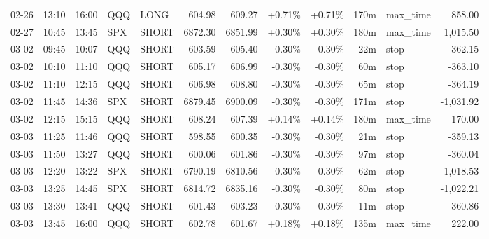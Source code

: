 \documentclass[11pt,a4paper,twoside]{article}
\begin{document}
\begin{center}
\begin{longtable}{>{\color{txtmain}}l l l l l r r r r r >{\color{txtmain}}l r}
02-26 & 13:10 & 16:00 & QQQ & LONG & 604.98 & 609.27 & \textcolor{wingreen}{+0.71\%} & \textcolor{wingreen}{+0.71\%} & 170m & max\_time & \textcolor{wingreen}{858.00} \\
02-27 & 10:45 & 13:45 & SPX & SHORT & 6872.30 & 6851.99 & \textcolor{wingreen}{+0.30\%} & \textcolor{wingreen}{+0.30\%} & 180m & max\_time & \textcolor{wingreen}{1,015.50} \\
03-02 & 09:45 & 10:07 & QQQ & SHORT & 603.59 & 605.40 & \textcolor{lossred}{-0.30\%} & \textcolor{lossred}{-0.30\%} & 22m & stop & \textcolor{lossred}{-362.15} \\
03-02 & 10:10 & 11:10 & QQQ & SHORT & 605.17 & 606.99 & \textcolor{lossred}{-0.30\%} & \textcolor{lossred}{-0.30\%} & 60m & stop & \textcolor{lossred}{-363.10} \\
03-02 & 11:10 & 12:15 & QQQ & SHORT & 606.98 & 608.80 & \textcolor{lossred}{-0.30\%} & \textcolor{lossred}{-0.30\%} & 65m & stop & \textcolor{lossred}{-364.19} \\
03-02 & 11:45 & 14:36 & SPX & SHORT & 6879.45 & 6900.09 & \textcolor{lossred}{-0.30\%} & \textcolor{lossred}{-0.30\%} & 171m & stop & \textcolor{lossred}{-1,031.92} \\
03-02 & 12:15 & 15:15 & QQQ & SHORT & 608.24 & 607.39 & \textcolor{wingreen}{+0.14\%} & \textcolor{wingreen}{+0.14\%} & 180m & max\_time & \textcolor{wingreen}{170.00} \\
03-03 & 11:25 & 11:46 & QQQ & SHORT & 598.55 & 600.35 & \textcolor{lossred}{-0.30\%} & \textcolor{lossred}{-0.30\%} & 21m & stop & \textcolor{lossred}{-359.13} \\
03-03 & 11:50 & 13:27 & QQQ & SHORT & 600.06 & 601.86 & \textcolor{lossred}{-0.30\%} & \textcolor{lossred}{-0.30\%} & 97m & stop & \textcolor{lossred}{-360.04} \\
03-03 & 12:20 & 13:22 & SPX & SHORT & 6790.19 & 6810.56 & \textcolor{lossred}{-0.30\%} & \textcolor{lossred}{-0.30\%} & 62m & stop & \textcolor{lossred}{-1,018.53} \\
03-03 & 13:25 & 14:45 & SPX & SHORT & 6814.72 & 6835.16 & \textcolor{lossred}{-0.30\%} & \textcolor{lossred}{-0.30\%} & 80m & stop & \textcolor{lossred}{-1,022.21} \\
03-03 & 13:30 & 13:41 & QQQ & SHORT & 601.43 & 603.23 & \textcolor{lossred}{-0.30\%} & \textcolor{lossred}{-0.30\%} & 11m & stop & \textcolor{lossred}{-360.86} \\
03-03 & 13:45 & 16:00 & QQQ & SHORT & 602.78 & 601.67 & \textcolor{wingreen}{+0.18\%} & \textcolor{wingreen}{+0.18\%} & 135m & max\_time & \textcolor{wingreen}{222.00} \\

\end{longtable}
\end{center}
\end{document}
